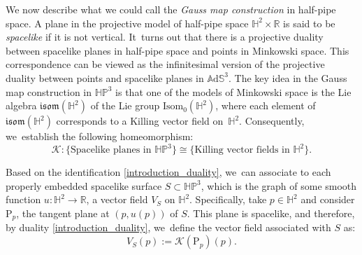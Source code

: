 \documentclass[11pt]{article}
\theoremstyle{plain}
\theoremstyle{definition}
\newcommand{\ads}{\mathbb{A}\mathrm{d}\mathbb{S}^3}
\newcommand{\HP}{\mathbb{HP}^3}
\begin{document}
We now describe what we could call the \emph{Gauss map construction} in half-pipe space. A plane in the projective model of half-pipe space \(\mathbb{H}^2 \times \mathbb{R}\) is said to be \emph{spacelike} if it is not vertical. It~turns out that there is a projective duality between spacelike planes in half-pipe space and points in Minkowski space. This correspondence can be viewed as the infinitesimal version of the projective duality between points and spacelike planes in \(\ads\). The key idea in the Gauss map construction in \(\HP\) is that one of the models of Minkowski space is the Lie algebra \(\mathfrak{isom}(\mathbb{H}^2)\) of the Lie group \(\text{Isom}_0(\mathbb{H}^2)\), where each element of \(\mathfrak{isom}(\mathbb{H}^2)\) corresponds to a Killing vector field on~\(\mathbb{H}^2\). Consequently, we~establish the following homeomorphism:
\begin{equation}\label{introduction_duality}
\mathcal{K}: \{\text{Spacelike planes in } \HP\} \cong \{\text{Killing vector fields in } \mathbb{H}^2\}.
\end{equation}

Based on the identification \eqref{introduction_duality}, we~can associate to each properly embedded spacelike surface \(S \subset \HP\), which is the graph of some smooth function \(u: \mathbb{H}^2 \to \mathbb{R}\), a vector field \(V_S\) on \(\mathbb{H}^2\). Specifically, take \(p \in \mathbb{H}^2\) and consider \(\mathrm{P}_p\), the tangent plane at \((p,u(p))\) of \(S\). This plane is spacelike, and therefore, by duality \eqref{introduction_duality}, we~define the vector field associated with \(S\) as:
\begin{equation}\label{2}
V_S(p):=\mathcal{K}(\mathrm{P}_p)(p).
\end{equation}
\end{document}

